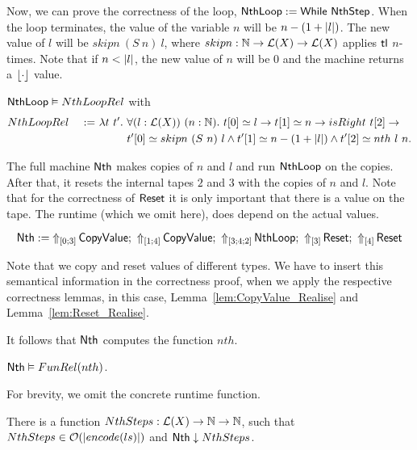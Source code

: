 Now, we can prove the correctness of the loop, $\MS{NthLoop} := \While~\MS{NthStep}$.  When the loop terminates, the value of the variable $n$ will be
$n - (1 + \length{l})$.  The new value of $l$ will be $skipn~(S~n)~l$, where $skipn : \Nat \to \List(X) \to \List(X)$ applies $\tl$ $n$-times.  Note
that if $n < \length{l}$, the new value of $n$ will be $0$ and the machine returns a $\Some\cdot$ value.

\begin{lemma}
  \label{lem:Nth_Loop_Realise}
  $\MS{NthLoop} \Realise NthLoopRel$ with
  \begin{alignat*}{2}
    & NthLoopRel &~:=~& \lambda t~t'.~\forall (l:\List(X))~(n:\Nat).~t[0] \simeq l \rightarrow t[1] \simeq n \rightarrow isRight~t[2] \rightarrow \\
    &            &~  ~& \phantom{\lambda t~t'.}~t'[0] \simeq skipn~(S~n)~l \land t'[1] \simeq n-(1+\length{l}) \land t'[2] \simeq nth~l~n.
  \end{alignat*}
\end{lemma}

The full machine $\MS{Nth}$ makes copies of $n$ and $l$ and run $\MS{NthLoop}$ on the copies.  After that, it resets the internal tapes $2$ and $3$
with the copies of $n$ and $l$.  Note that for the correctness of $\MS{Reset}$ it is only important that there is a value on the tape.  The runtime
(which we omit here), does depend on the actual values.
\begin{definition}[$\MS{Nth}$]
  \[
    \MS{Nth} := \LiftTapes{\MS{CopyValue}}{\Vector{0;3}} \Seq
    \LiftTapes{\MS{CopyValue}}{\Vector{1;4}} \Seq
    \LiftTapes{\MS{NthLoop}}{\Vector{3;4;2}} \Seq
    \LiftTapes{\MS{Reset}}{\Vector{3}} \Seq
    \LiftTapes{\MS{Reset}}{\Vector{4}}
  \]
\end{definition}
Note that we copy and reset values of different types.  We have to insert this semantical information in the correctness proof, when we apply the
respective correctness lemmas, in this case, Lemma~\ref{lem:CopyValue_Realise} and Lemma~\ref{lem:Reset_Realise}.

It follows that $\MS{Nth}$ computes the function $nth$.
\begin{lemma}
  \label{lem:Nth_Computes}
  $\MS{Nth} \Realise FunRel(nth)$.
\end{lemma}

For brevity, we omit the concrete runtime function.
\begin{lemma}
  \label{lem:Nth_TerminatesIn}
  There is a function $NthSteps:\List(X)\to\Nat\to\Nat$, such that $NthSteps \in \mathcal{O}(\size{ls})$ and $\MS{Nth} \TerminatesIn NthSteps$.
\end{lemma}


